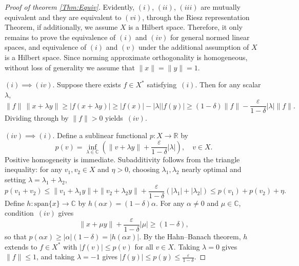 \documentclass[11pt, reqno]{amsart}
\theoremstyle{definition}
\begin{document}
\begin{proof}[Proof of theorem \ref{Thm:Equiv}]
Evidently, $(i)$, $(ii)$, $(iii)$ are mutually equivalent and they are equivalent to $(vi)$, through the Riesz representation Theorem, if additionally, we assume $X$ is a Hilbert space. Therefore, it only remains to prove the equivalence of $(i)$ and $(iv)$ for general normed linear spaces, and equivalence of $(i)$ and $(v)$ under the additional assumption of $X$ is a Hilbert space. Since norming approximate orthogonality is homogeneous, without loss of generality we assume that $\|x\|=\|y\|=1$.

\medskip




\noindent $(i)\implies(iv)$. Suppose there exists $f\in X^*$ 
satisfying~$(i)$. Then for any scalar $\lambda$,
\[
\|f\|\,\|x+\lambda y\|\geq|f(x+\lambda y)|\geq|f(x)|-|\lambda||f(y)|
\geq(1-\delta)\|f\|-\frac{\varepsilon}{1-\delta}|\lambda|\|f\|.
\]
Dividing through by $\|f\|>0$ yields~$(iv)$.

\medskip

\noindent $(iv)\implies(i)$. Define a sublinear functional 
$p:X\to\mathbb{R}$ by
\[
p(v)=\inf_{\lambda\in\mathbb{C}}\left(\|v+\lambda y\|
+\frac{\varepsilon}{1-\delta}|\lambda|\right),\quad v\in X.
\]
Positive homogeneity is immediate. Subadditivity follows from the 
triangle inequality: for any $v_1,v_2\in X$ and $\eta>0$, choosing 
$\lambda_1,\lambda_2$ nearly optimal and setting $\lambda=\lambda_1+\lambda_2$,
\[
p(v_1+v_2)\leq\|v_1+\lambda_1 y\|+\|v_2+\lambda_2 y\|
+\frac{\varepsilon}{1-\delta}(|\lambda_1|+|\lambda_2|)
\leq p(v_1)+p(v_2)+\eta.
\]
Define $h:\mathrm{span}\{x\}\to\mathbb{C}$ by $h(\alpha x)=(1-\delta)\alpha$. 
For any $\alpha\neq 0$ and $\mu\in\mathbb{C}$, condition~$(iv)$ gives
\[
\|x+\mu y\|+\frac{\varepsilon}{1-\delta}|\mu|\geq(1-\delta),
\]
so that $p(\alpha x)\geq|\alpha|(1-\delta)=|h(\alpha x)|$. By the 
Hahn--Banach theorem, $h$ extends to $f\in X^*$ with $|f(v)|\leq p(v)$ 
for all $v\in X$. Taking $\lambda=0$ gives $\|f\|\leq 1$, and taking 
$\lambda=-1$ gives $|f(y)|\leq p(y)\leq\frac{\varepsilon}{1-\delta}$.

\medskip


\end{proof}
\end{document}
